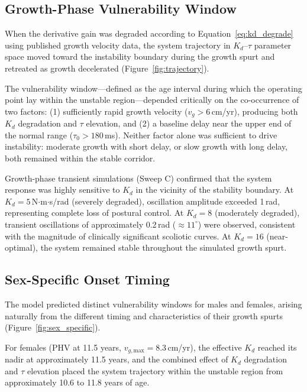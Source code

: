 \documentclass[12pt,a4paper]{article}
\begin{document}
\subsection{Growth-Phase Vulnerability Window}

When the derivative gain was degraded according to Equation~\ref{eq:kd_degrade} using published growth velocity data, the system trajectory in $K_d$--$\tau$ parameter space moved toward the instability boundary during the growth spurt and retreated as growth decelerated (Figure~\ref{fig:trajectory}).

The vulnerability window---defined as the age interval during which the operating point lay within the unstable region---depended critically on the co-occurrence of two factors: (1) sufficiently rapid growth velocity ($v_g > 6$\,cm/yr), producing both $K_d$ degradation and $\tau$ elevation, and (2) a baseline delay near the upper end of the normal range ($\tau_0 > 180$\,ms). Neither factor alone was sufficient to drive instability: moderate growth with short delay, or slow growth with long delay, both remained within the stable corridor.

Growth-phase transient simulations (Sweep C) confirmed that the system response was highly sensitive to $K_d$ in the vicinity of the stability boundary. At $K_d = 5$\,N$\cdot$m$\cdot$s/rad (severely degraded), oscillation amplitude exceeded 1\,rad, representing complete loss of postural control. At $K_d = 8$ (moderately degraded), transient oscillations of approximately 0.2\,rad ($\approx 11^{\circ}$) were observed, consistent with the magnitude of clinically significant scoliotic curves. At $K_d = 16$ (near-optimal), the system remained stable throughout the simulated growth spurt.

\subsection{Sex-Specific Onset Timing}

The model predicted distinct vulnerability windows for males and females, arising naturally from the different timing and characteristics of their growth spurts (Figure~\ref{fig:sex_specific}).

For females (PHV at 11.5 years, $v_{g,\text{max}} = 8.3$\,cm/yr), the effective $K_d$ reached its nadir at approximately 11.5 years, and the combined effect of $K_d$ degradation and $\tau$ elevation placed the system trajectory within the unstable region from approximately 10.6 to 11.8 years of age.
\end{document}
